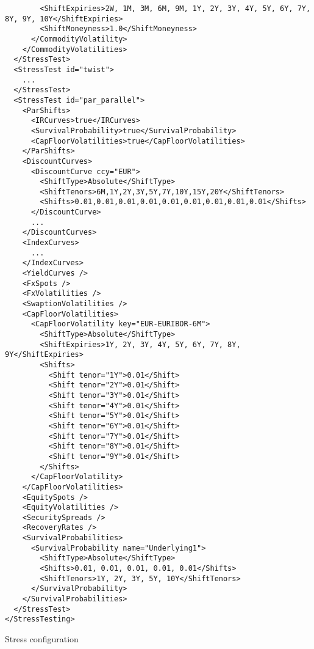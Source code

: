\begin{longlisting}
\begin{verbatim}
        <ShiftExpiries>2W, 1M, 3M, 6M, 9M, 1Y, 2Y, 3Y, 4Y, 5Y, 6Y, 7Y, 8Y, 9Y, 10Y</ShiftExpiries>
        <ShiftMoneyness>1.0</ShiftMoneyness>
      </CommodityVolatility>
    </CommodityVolatilities>
  </StressTest>
  <StressTest id="twist">
    ...
  </StressTest>
  <StressTest id="par_parallel">
    <ParShifts>
      <IRCurves>true</IRCurves>
      <SurvivalProbability>true</SurvivalProbability>
      <CapFloorVolatilities>true</CapFloorVolatilities>
    </ParShifts>
    <DiscountCurves>
      <DiscountCurve ccy="EUR">
        <ShiftType>Absolute</ShiftType>
        <ShiftTenors>6M,1Y,2Y,3Y,5Y,7Y,10Y,15Y,20Y</ShiftTenors>
        <Shifts>0.01,0.01,0.01,0.01,0.01,0.01,0.01,0.01,0.01</Shifts>
      </DiscountCurve>
      ...
    </DiscountCurves>
    <IndexCurves>
      ...
    </IndexCurves>
    <YieldCurves />
    <FxSpots />
    <FxVolatilities />
    <SwaptionVolatilities />
    <CapFloorVolatilities>
      <CapFloorVolatility key="EUR-EURIBOR-6M">
        <ShiftType>Absolute</ShiftType>
        <ShiftExpiries>1Y, 2Y, 3Y, 4Y, 5Y, 6Y, 7Y, 8Y, 9Y</ShiftExpiries>
        <Shifts>
          <Shift tenor="1Y">0.01</Shift>
          <Shift tenor="2Y">0.01</Shift>
          <Shift tenor="3Y">0.01</Shift>
          <Shift tenor="4Y">0.01</Shift>
          <Shift tenor="5Y">0.01</Shift>
          <Shift tenor="6Y">0.01</Shift>
          <Shift tenor="7Y">0.01</Shift>
          <Shift tenor="8Y">0.01</Shift>
          <Shift tenor="9Y">0.01</Shift>
        </Shifts>
      </CapFloorVolatility>
    </CapFloorVolatilities>
    <EquitySpots />
    <EquityVolatilities />
    <SecuritySpreads />
    <RecoveryRates />
    <SurvivalProbabilities>
      <SurvivalProbability name="Underlying1">
        <ShiftType>Absolute</ShiftType>
        <Shifts>0.01, 0.01, 0.01, 0.01, 0.01</Shifts>
        <ShiftTenors>1Y, 2Y, 3Y, 5Y, 10Y</ShiftTenors>
      </SurvivalProbability>
    </SurvivalProbabilities>
  </StressTest>
</StressTesting>
  \end{verbatim}
\caption{Stress configuration}
\label{lst:stress_config}
\end{longlisting}
